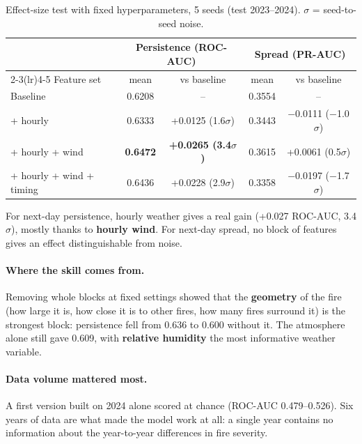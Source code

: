 \documentclass[11pt,a4paper,oneside]{report}
\newcommand{\sig}{\ensuremath{\sigma}}
\begin{document}
\begin{table}[H]
\centering\small
\caption[INPE effect-size test]{Effect-size test with fixed hyperparameters, 5
seeds (test 2023--2024). \sig{} = seed-to-seed noise.}
\label{tab:inpe-effect}
\begin{tabular}{lcccc}
\toprule
 & \multicolumn{2}{c}{Persistence (ROC-AUC)} & \multicolumn{2}{c}{Spread (PR-AUC)} \\
\cmidrule(lr){2-3}\cmidrule(lr){4-5}
Feature set & mean & vs baseline & mean & vs baseline \\
\midrule
Baseline & 0.6208 & -- & 0.3554 & -- \\
+ hourly & 0.6333 & +0.0125 (1.6\sig) & 0.3443 & $-$0.0111 ($-$1.0\sig) \\
+ hourly + wind & \textbf{0.6472} & \textbf{+0.0265 (3.4\sig)} & 0.3615 & +0.0061 (0.5\sig) \\
+ hourly + wind + timing & 0.6436 & +0.0228 (2.9\sig) & 0.3358 & $-$0.0197 ($-$1.7\sig) \\
\bottomrule
\end{tabular}
\end{table}

\begin{keybox}
For next-day persistence, hourly weather gives a real gain (+0.027 ROC-AUC,
3.4\sig), mostly thanks to \textbf{hourly wind}. For next-day spread, no block of
features gives an effect distinguishable from noise.
\end{keybox}

\paragraph{Where the skill comes from.} Removing whole blocks at fixed settings
showed that the \textbf{geometry} of the fire (how large it is, how close it is
to other fires, how many fires surround it) is the strongest block: persistence
fell from 0.636 to 0.600 without it. The atmosphere alone still gave 0.609, with
\textbf{relative humidity} the most informative weather variable.

\paragraph{Data volume mattered most.} A first version built on 2024 alone scored
at chance (ROC-AUC 0.479--0.526). Six years of data are what made the model work
at all: a single year contains no information about the year-to-year differences
in fire severity.
\end{document}
